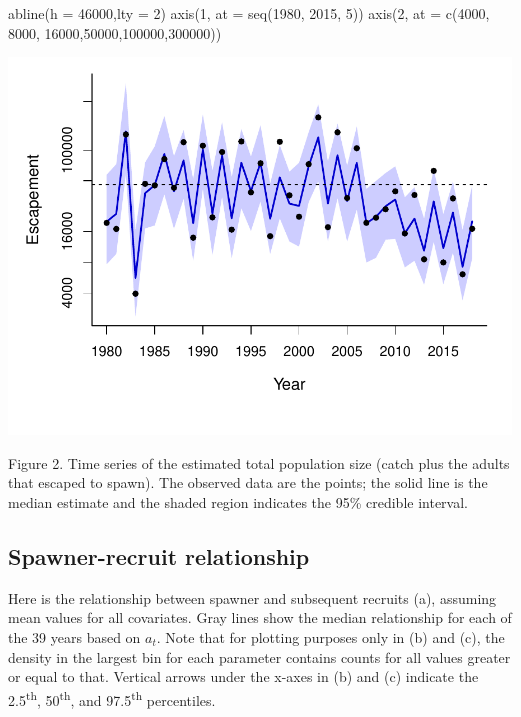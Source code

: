 \documentclass[11pt,]{article}
\newenvironment{Shaded}{}{}
\newcommand{\KeywordTok}[1]{\textcolor[rgb]{0.00,0.00,1.00}{#1}}
\newcommand{\DataTypeTok}[1]{#1}
\newcommand{\DecValTok}[1]{#1}
\newcommand{\NormalTok}[1]{#1}
\begin{document}
\begin{Shaded}
\begin{Highlighting}[]
\KeywordTok{abline}\NormalTok{(}\DataTypeTok{h =} \DecValTok{46000}\NormalTok{,}\DataTypeTok{lty =} \DecValTok{2}\NormalTok{)}
\KeywordTok{axis}\NormalTok{(}\DecValTok{1}\NormalTok{, }\DataTypeTok{at =} \KeywordTok{seq}\NormalTok{(}\DecValTok{1980}\NormalTok{, }\DecValTok{2015}\NormalTok{, }\DecValTok{5}\NormalTok{))}
\KeywordTok{axis}\NormalTok{(}\DecValTok{2}\NormalTok{, }\DataTypeTok{at =} \KeywordTok{c}\NormalTok{(}\DecValTok{4000}\NormalTok{, }\DecValTok{8000}\NormalTok{, }\DecValTok{16000}\NormalTok{,}\DecValTok{50000}\NormalTok{,}\DecValTok{100000}\NormalTok{,}\DecValTok{300000}\NormalTok{))}
\end{Highlighting}
\end{Shaded}

\begin{center}\includegraphics{App_3_Summarize_results_files/figure-latex/fig_2_run_size_1-1} \end{center}

Figure 2. Time series of the estimated total population size (catch plus
the adults that escaped to spawn). The observed data are the points; the
solid line is the median estimate and the shaded region indicates the
95\% credible interval.

\subsection{Spawner-recruit
relationship}\label{spawner-recruit-relationship}

Here is the relationship between spawner and subsequent recruits (a),
assuming mean values for all covariates. Gray lines show the median
relationship for each of the 39 years based on \(a_t\). Note that for
plotting purposes only in (b) and (c), the density in the largest bin
for each parameter contains counts for all values greater or equal to
that. Vertical arrows under the x-axes in (b) and (c) indicate the
2.5\textsuperscript{th}, 50\textsuperscript{th}, and
97.5\textsuperscript{th} percentiles.
\end{document}
